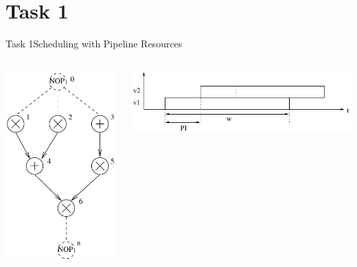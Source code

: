
\section{Task 1}

\setcounter{task}{1}

\begin{frame}[allowframebreaks]{Task 1}{Scheduling with Pipeline Resources}
  \begin{tasknoinc}
    \begin{columns}
      \begin{column}{.3\textwidth}
        \centering
        \includegraphics[width=.7\textwidth]{./figures/task1_pipeline_resource_sequence_graph.png}
      \end{column}
      \begin{column}{.7\textwidth}
        \centering
        \includegraphics[width=.7\textwidth]{./figures/task1_tasks_on_pipeline_resource.png}
      \end{column}
    \end{columns}
  \end{tasknoinc}
\end{frame}
